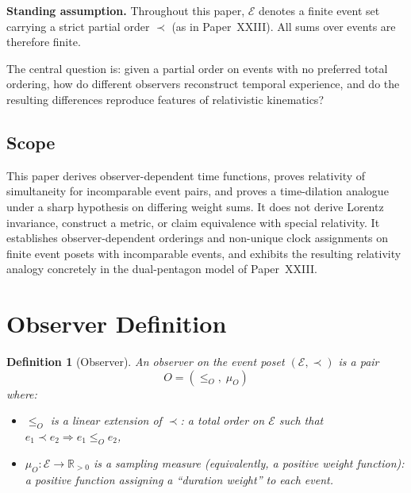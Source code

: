 \documentclass[12pt]{article}
\newtheorem{definition}[theorem]{Definition}
\newcommand{\Ecal}{\mathcal{E}}
\begin{document}
\medskip
\noindent\textbf{Standing assumption.} Throughout this paper, $\Ecal$ denotes a finite event set carrying a strict partial order $\prec$ (as in Paper~XXIII). All sums over events are therefore finite.
\medskip

The central question is: given a partial order on events with no preferred total ordering, how do different observers reconstruct temporal experience, and do the resulting differences reproduce features of relativistic kinematics?

\subsection*{Scope}

This paper derives observer-dependent time functions, proves relativity of simultaneity for incomparable event pairs, and proves a time-dilation analogue under a sharp hypothesis on differing weight sums. It does not derive Lorentz invariance, construct a metric, or claim equivalence with special relativity. It establishes observer-dependent orderings and non-unique clock assignments on finite event posets with incomparable events, and exhibits the resulting relativity analogy concretely in the dual-pentagon model of Paper~XXIII.

\section{Observer Definition}\label{sec:observer}

\begin{definition}[Observer]\label{def:observer}
An \textit{observer} on the event poset $(\Ecal, \prec)$ is a pair
\begin{equation}
    O = (\leq_O,\; \mu_O)
\end{equation}
where:
\begin{itemize}
    \item $\leq_O$ is a linear extension of $\prec$: a total order on $\Ecal$ such that $e_1 \prec e_2 \Rightarrow e_1 \leq_O e_2$,
    \item $\mu_O: \Ecal \to \mathbb{R}_{>0}$ is a \textit{sampling measure} (equivalently, a positive weight function): a positive function assigning a ``duration weight'' to each event.
\end{itemize}
\end{definition}
\end{document}
